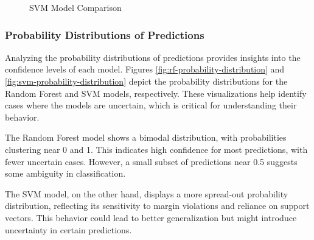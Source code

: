 \begin{figure}[h]
\begin{minipage}[c]{0.47\textwidth}
                    \caption{SVM Model Comparison}
                    \label{fig:logistic_cm}
                \end{minipage}
            \end{figure}
            
        \vspace{-0.1cm}
        
        \subsubsection{Probability Distributions of Predictions \\}
        
            Analyzing the probability distributions of predictions provides insights into the confidence levels of each model. Figures \ref{fig:rf-probability-distribution} and \ref{fig:svm-probability-distribution} depict the probability distributions for the Random Forest and SVM models, respectively. These visualizations help identify cases where the models are uncertain, which is critical for understanding their behavior.
            
            The Random Forest model shows a bimodal distribution, with probabilities clustering near 0 and 1. This indicates high confidence for most predictions, with fewer uncertain cases. However, a small subset of predictions near 0.5 suggests some ambiguity in classification.
            
            The SVM model, on the other hand, displays a more spread-out probability distribution, reflecting its sensitivity to margin violations and reliance on support vectors. This behavior could lead to better generalization but might introduce uncertainty in certain predictions.
            
